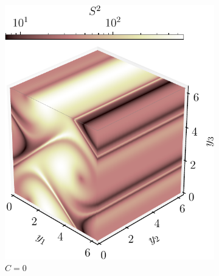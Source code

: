 \begin{figure}
	\centering
	\begin{subfigure}[t]{0.49\textwidth}
		\includegraphics[width=\textwidth]{chp04_paper_numerics/figures/gabc/S2_box_1.7320508075688772_1.4142135623730951_0_cropped}
		\caption{\(C = 0\)}
		\label{fig:gabc_S2_0}
	\end{subfigure}
	\begin{subfigure}[t]{0.49\textwidth}

\end{subfigure}
\end{figure}
